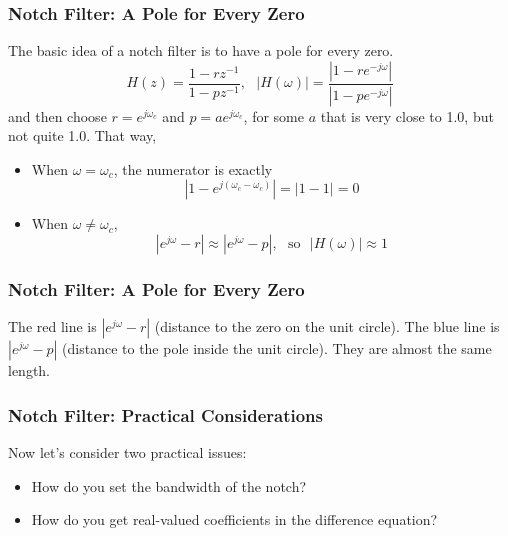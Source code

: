 \documentclass{beamer}
\begin{document}
\begin{frame}
  \frametitle{Notch Filter: A Pole for Every Zero}

  The basic idea of a notch filter is to have a pole for every zero.
  \begin{displaymath}
    H(z)=\frac{1-rz^{-1}}{1-pz^{-1}},~~~|H(\omega)|=\frac{|1-re^{-j\omega}|}{|1-pe^{-j\omega}|}
  \end{displaymath}
  and then choose $r=e^{j\omega_c}$ and $p=ae^{j\omega_c}$, for some
  $a$ that is very close to 1.0, but not quite 1.0.  That way,
  \begin{itemize}
  \item When $\omega=\omega_c$, the numerator is exactly
    \begin{displaymath}
      |1-e^{j(\omega_c-\omega_c)}|=|1-1|=0
    \end{displaymath}
  \item When $\omega\ne\omega_c$,
    \begin{displaymath}
      |e^{j\omega}-r|\approx |e^{j\omega}-p|,~~~\mbox{so}~~~|H(\omega)|\approx 1
    \end{displaymath}
  \end{itemize}
\end{frame}

\begin{frame}
  \frametitle{Notch Filter: A Pole for Every Zero} The red line is
  $|e^{j\omega}-r|$ (distance to the zero on the unit circle).  The
  blue line is $|e^{j\omega}-p|$ (distance to the pole inside the unit
  circle).  They are almost the same length.
  \centerline{}
\end{frame}

\begin{frame}
  \frametitle{Notch Filter: Practical Considerations}

  Now let's consider two practical issues:
  \begin{itemize}
  \item How do you set the bandwidth of the notch?
  \item How do you get real-valued coefficients in the difference equation?
  \end{itemize}
\end{frame}
\end{document}
